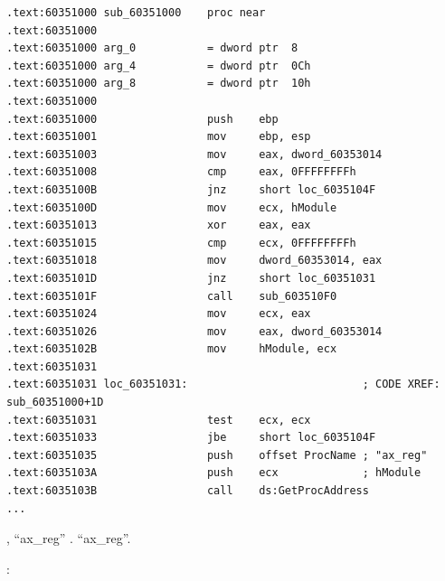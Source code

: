 \begin{lstlisting}
.text:60351000 sub_60351000    proc near
.text:60351000
.text:60351000 arg_0           = dword ptr  8
.text:60351000 arg_4           = dword ptr  0Ch
.text:60351000 arg_8           = dword ptr  10h
.text:60351000
.text:60351000                 push    ebp
.text:60351001                 mov     ebp, esp
.text:60351003                 mov     eax, dword_60353014
.text:60351008                 cmp     eax, 0FFFFFFFFh
.text:6035100B                 jnz     short loc_6035104F
.text:6035100D                 mov     ecx, hModule
.text:60351013                 xor     eax, eax
.text:60351015                 cmp     ecx, 0FFFFFFFFh
.text:60351018                 mov     dword_60353014, eax
.text:6035101D                 jnz     short loc_60351031
.text:6035101F                 call    sub_603510F0
.text:60351024                 mov     ecx, eax
.text:60351026                 mov     eax, dword_60353014
.text:6035102B                 mov     hModule, ecx
.text:60351031
.text:60351031 loc_60351031:                           ; CODE XREF: sub_60351000+1D
.text:60351031                 test    ecx, ecx
.text:60351033                 jbe     short loc_6035104F
.text:60351035                 push    offset ProcName ; "ax_reg"
.text:6035103A                 push    ecx             ; hModule
.text:6035103B                 call    ds:GetProcAddress
...
\end{lstlisting}

, ``ax\_reg'' . 
 ``ax\_reg''.

:

